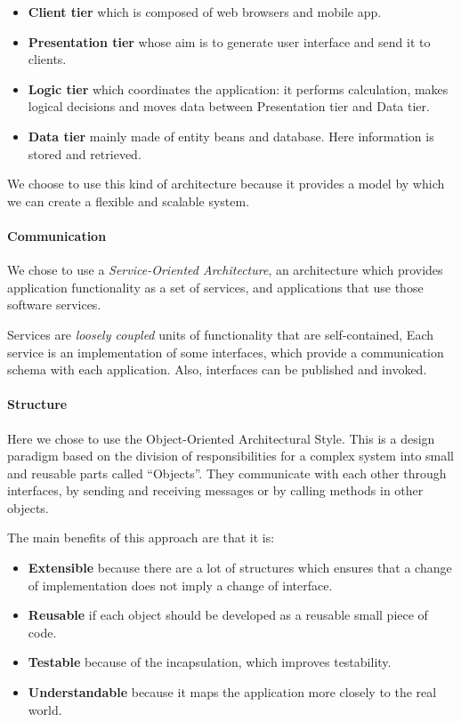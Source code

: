 \begin{itemize}
    \item{\textbf{Client tier} which is composed of web browsers and mobile app.}
    \item{\textbf{Presentation tier} whose aim is to generate user interface and send it to clients.}
    \item{\textbf{Logic tier} which coordinates the application: it performs calculation, makes logical decisions and moves data between Presentation tier and Data tier.}
    \item{\textbf{Data tier} mainly made of entity beans and database. 
    Here information is stored and retrieved.}
\end{itemize}

We choose to use this kind of architecture because it provides a model by which
we can create a flexible and scalable system.

\paragraph{Communication} We chose to use a \emph{Service-Oriented Architecture}, 
an architecture which provides application functionality as a set of services, 
and applications that use those software services. 

Services are \textit{loosely coupled} units of functionality that are self-contained, 
Each service is an implementation of some interfaces, which provide a communication schema with
each application. Also, interfaces can be published and invoked.

\paragraph{Structure} Here we chose to use the Object-Oriented Architectural Style.
This is a design paradigm based on the division of responsibilities for a complex system
into small and reusable parts called ``Objects''.
They communicate with each other through interfaces, by sending and receiving messages
or by calling methods in other objects.

The main benefits of this approach are that it is:

\begin{itemize}
    \item{\textbf{Extensible} because there are a lot of structures which ensures that a change of implementation does not imply a change of interface.}
    \item{\textbf{Reusable} if each object should be developed as a reusable small piece of code.}
    \item{\textbf{Testable} because of the incapsulation, which improves testability.}
    \item{\textbf{Understandable} because it maps the application more closely to the real world.}
\end{itemize}


